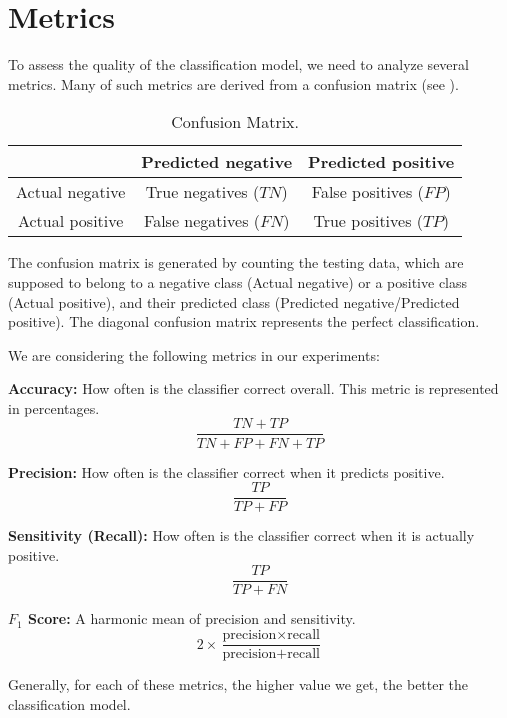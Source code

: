 \section{Metrics}
To assess the quality of the classification model, we need to analyze several metrics. Many of such metrics are derived from a confusion matrix (see ).
\begin{table}[ht]
    \centering
    \begin{tabular}{|c|c|c|}
        \hline
        & Predicted negative & Predicted positive \\
        \hline 
        Actual negative & True negatives ($TN$) & False positives ($FP$) \\
        \hline
        Actual positive & False negatives ($FN$) & True positives ($TP$)  \\
        \hline
    \end{tabular}
    \caption[Confusion Matrix]{Confusion Matrix.}
    \label{tab:confusion_matrix}
\end{table}
The confusion matrix is generated by counting the testing data, which are supposed to belong to a negative class (Actual negative) or a positive class (Actual positive), and their predicted class (Predicted negative/Predicted positive). The diagonal confusion matrix represents the perfect classification.

We are considering the following metrics in our experiments:
\begin{description}
    \item{\textbf{Accuracy:}} How often is the classifier correct overall. This metric is represented in percentages.
    \begin{equation}
        \frac{TN+TP}{TN+FP+FN+TP}
        \label{eq:svm:accuracy}
    \end{equation}
    \item{\textbf{Precision:}} How often is the classifier correct when it predicts positive.
    \begin{equation}
        \frac{TP}{TP+FP}
        \label{eq:svm:precision}
    \end{equation}
    \item{\textbf{Sensitivity (Recall):}} How often is the classifier correct when it is actually positive.
    \begin{equation}
        \frac{TP}{TP+FN}
        \label{eq:svm:sensitivity}
    \end{equation}
    \item{\textbf{\( F_1 \) Score:}} A harmonic mean of precision and sensitivity.
    \begin{equation}
        2\times\frac{\text{precision}\times\text{recall}}{\text{precision}+\text{recall}}
        \label{eq:svm:F1}
    \end{equation}
\end{description}

Generally, for each of these metrics, the higher value we get, the better the classification model.
